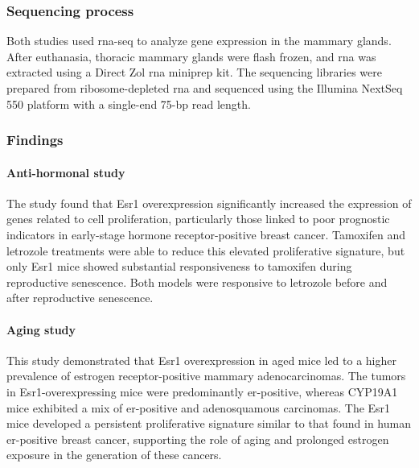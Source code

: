\subsubsection{Sequencing process} \label{sec:dataset_sequencing}
Both studies used \gls{rna-seq} to analyze gene expression in the mammary
glands.
After euthanasia, thoracic mammary glands were flash frozen, and \gls{rna} was
extracted using a Direct Zol \gls{rna} miniprep kit.
The sequencing libraries were prepared from ribosome-depleted \gls{rna} and
sequenced using the Illumina NextSeq 550 platform with a single-end 75-bp read
length\supercite{furth_esr1_2023,furth_overexpression_2023}.

\subsubsection{Findings}

\paragraph{Anti-hormonal study}
The study found that Esr1 overexpression significantly increased the expression
of genes related to cell proliferation, particularly those linked to poor
prognostic indicators in early-stage hormone receptor-positive breast cancer.
Tamoxifen and letrozole treatments were able to reduce this elevated
proliferative signature, but only Esr1 mice showed substantial responsiveness
to tamoxifen during reproductive senescence.
Both models were responsive to letrozole before and after reproductive
senescence\supercite{furth_esr1_2023}.

\paragraph{Aging study}
This study demonstrated that Esr1 overexpression in aged mice led to a higher
prevalence of estrogen receptor-positive mammary adenocarcinomas.
The tumors in Esr1-overexpressing mice were predominantly \gls{er}-positive,
whereas CYP19A1 mice exhibited a mix of \gls{er}-positive and adenosquamous
carcinomas.
The Esr1 mice developed a persistent proliferative signature similar to that
found in human \gls{er}-positive breast cancer, supporting the role of aging
and prolonged estrogen exposure in the generation of these
cancers\supercite{furth_overexpression_2023}.

